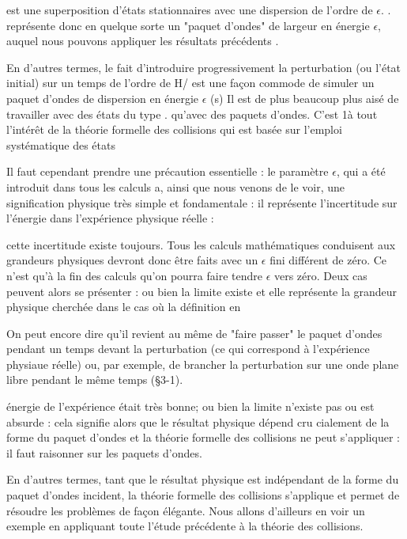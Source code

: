 {{{%

est une superposition d'états stationnaires  avec une dispersion
de l'ordre de $\epsilon$. . représente donc en quelque sorte un "paquet
d'ondes" de largeur en énergie $\epsilon$, auquel nous pouvons appliquer les résultats précédents .

En d'autres termes, le fait d'introduire progressivement la
perturbation (ou l'état initial) sur un temps de l'ordre de H/ est une
façon commode de simuler un paquet d'ondes de dispersion en énergie $\epsilon$ (s)
Il est de plus beaucoup plus aisé de travailler avec des états du type
. qu'avec des paquets d'ondes. C'est 1à tout l'intérêt de la
théorie formelle des collisions qui est basée sur l'emploi systématique
des états 

Il faut cependant prendre une précaution essentielle : le
paramètre $\epsilon$, qui a été introduit dans tous les calculs a, ainsi que nous
venons de le voir, une signification physique très simple et fondamentale :
il représente l'incertitude sur l'énergie dans l'expérience physique réelle :

cette incertitude existe toujours. Tous les calculs mathématiques conduisent
aux grandeurs physiques devront donc être faits avec un $\epsilon$ fini différent de
zéro. Ce n'est qu'à la fin des calculs qu'on pourra faire tendre $\epsilon$ vers zéro.
Deux cas peuvent alors se présenter : ou bien la limite existe et elle
représente la grandeur physique cherchée dans le cas où la définition en

 On peut encore dire qu'il revient au même de "faire passer" le paquet
d'ondes pendant un temps  devant la perturbation (ce qui correspond
à l'expérience physiaue réelle) ou, par exemple, de brancher la perturbation sur
une onde plane libre pendant le même temps (\S 3-1).

 

énergie de l'expérience était très bonne; ou bien la limite n'existe pas
ou est absurde : cela signifie alors que le résultat physique dépend cru
cialement de la forme du paquet d'ondes et la théorie formelle des collisions
ne peut s'appliquer : il faut raisonner sur les paquets d'ondes.

En d'autres termes, tant que le résultat physique est indépendant de la
forme du paquet d'ondes incident, la théorie formelle des collisions
s'applique et permet de résoudre les problèmes de façon élégante. Nous
allons d'ailleurs en voir un exemple en appliquant toute l'étude précédente à la
théorie des collisions.

}}}
